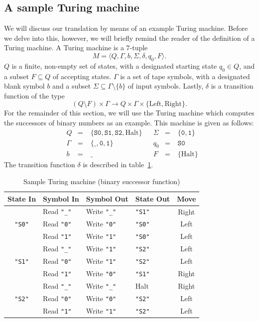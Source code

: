 \documentclass[11pt]{article}
\def\t#1{\texttt{#1}}
\begin{document}
\subsection{A sample Turing machine}
We will discuss our translation by means of an example Turing machine. Before we
delve into this, however, we will briefly remind the reader of the definition of
a Turing machine. A Turing machine is a 7-tuple
\[
  M = \langle Q, \Gamma, b, \Sigma, \delta, q_0, F \rangle.
\]
$Q$ is a finite, non-empty set of states, with a designated starting state $q_0
\in Q$, and a subset $F \subseteq Q$ of accepting states. $\Gamma$ is a set of
tape symbols, with a designated blank symbol $b$ and a subset $\Sigma \subseteq
\Gamma \setminus \{b\}$ of input symbols. Lastly, $\delta$ is a transition
function of the type
\[
  (Q \setminus F) \times \Gamma \to Q \times \Gamma \times \{\text{Left},\text{Right}\}.
\]
For the remainder of this section, we will use the Turing machine which computes
the successors of binary numbers as an example. This machine is given as follows:
\[\!
\begin{aligned}
  &Q&      \!\!\!\!=\;& \{\t{S0}, \t{S1}, \t{S2}, \text{Halt}\} &&\Sigma& \!\!\!\!=\;& \{\t{0}, \t{1}\} \\
  &\Gamma& \!\!\!\!=\;& \{\t{\_}, \t{0}, \t{1}\}                &&q_0&    \!\!\!\!=\;& \t{S0} \\
  &b&      \!\!\!\!=\;& \t{\_}                                  &&F&      \!\!\!\!=\;& \{\text{Halt}\}
\end{aligned}
\]
The transition function $\delta$ is described in table~\ref{tab:tm}.
%
\begin{table}[h]
  \centering
  \begin{tabular}{cl|llc}
    \textbf{State In} & \textbf{Symbol In} & \textbf{Symbol Out} & \textbf{State Out} & \textbf{Move} \\ \hline
                   & Read \t{"\_"} & Write \t{"\_"} & \t{"S1"} & Right \\
    \t{"S0"}       & Read \t{"0"}  & Write \t{"0"}  & \t{"S0"} & Left  \\
                   & Read \t{"1"}  & Write \t{"1"}  & \t{"S0"} & Left  \\ \cline{1-5}
                   & Read \t{"\_"} & Write \t{"1"}  & \t{"S2"} & Left  \\
    \t{"S1"}       & Read \t{"0"}  & Write \t{"1"}  & \t{"S2"} & Left  \\
                   & Read \t{"1"}  & Write \t{"0"}  & \t{"S1"} & Right \\ \cline{1-5}
                   & Read \t{"\_"} & Write \t{"\_"} & Halt     & Right \\ 
    \t{"S2"}       & Read \t{"0"}  & Write \t{"0"}  & \t{"S2"} & Left  \\
                   & Read \t{"1"}  & Write \t{"1"}  & \t{"S2"} & Left  
  \end{tabular}
  \caption{Sample Turing machine (binary successor function)}
  \label{tab:tm}
\end{table}
\end{document}
